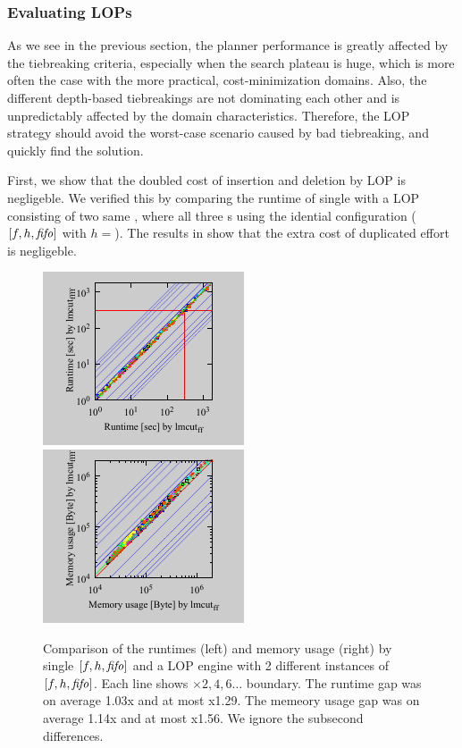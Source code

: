 \subsubsection{Evaluating LOPs}

As we see in the previous section, the planner performance is greatly
affected by the tiebreaking criteria, especially when the search plateau
is huge, which is more often the case with the more practical,
cost-minimization domains.
% 
Also, the different depth-based tiebreakings are not dominating
each other and is unpredictably affected by the domain characteristics.
% 
Therefore, the LOP strategy should avoid the
worst-case scenario caused by bad tiebreaking, and quickly find the solution.

First, we show that the doubled cost of insertion and deletion by LOP is
negligeble.  We verified this by comparing the runtime of single \astar
with a LOP consisting of two same \astar, where all three \astar{}s
using the idential configuration ($[f,h,\mbox{\textit{fifo}}]$ with $h=$\lmcut). The
results in  show that the extra cost of duplicated effort
is negligeble.

\begin{figure}[tb]
 \centering {}
 \includegraphics{tables/aaai16-30min/aaai16prelim3/time-nokey-lmcut_ff-lmcut_ffff.pdf}
 \includegraphics{tables/aaai16-30min/aaai16prelim3/mem-nokey-lmcut_ff-lmcut_ffff.pdf}
 \caption{Comparison of the runtimes (left) and memory usage (right) by
 single $[f,h,\mbox{\textit{fifo}}]$ and a LOP engine with 2 different instances of
 $[f,h,\mbox{\textit{fifo}}]$. Each line shows $\times 2,4,6\ldots$ boundary.
 The runtime gap was on average 1.03x and at most x1.29.
 The memeory usage gap was on average 1.14x and at most x1.56.
 We ignore the subsecond differences.}  \label{ffff}
\end{figure}

